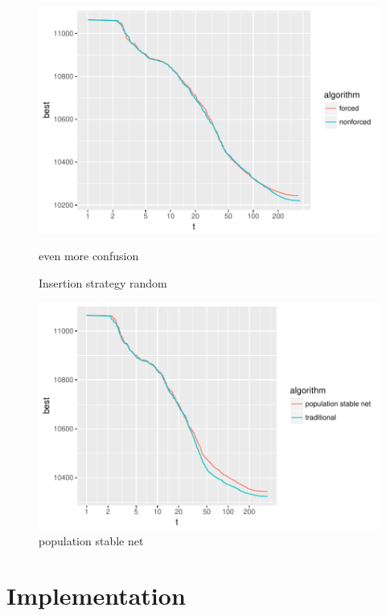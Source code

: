 \documentclass[a4paper,12pt,bibtotoc,titlepage, liststotoc,BCOR7mm,headsepline,pointlessnumbers]{scrbook}
\numberwithin{equation}{section}
\begin{document}
\begin{figure}
\caption{Insertion strategy random}
\begin{center}
\includegraphics{bachelorarbeit-insertrandom}
\end{center}
even more confusion

\end{figure}

\begin{figure}
\caption{population stable net}
\begin{center}
\includegraphics{bachelorarbeit-test6}
\end{center}
\end{figure}





\section{Implementation}
\end{document}
